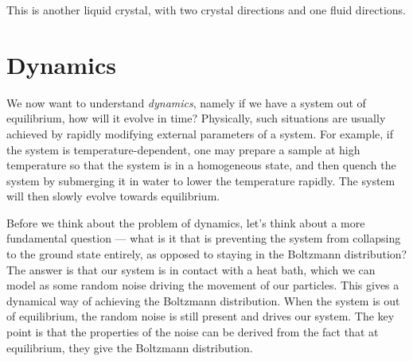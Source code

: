 \documentclass[a4paper]{article}
\begin{document}
This is another liquid crystal, with two crystal directions and one fluid directions.

\section{Dynamics}
We now want to understand \emph{dynamics}, namely if we have a system out of equilibrium, how will it evolve in time? Physically, such situations are usually achieved by rapidly modifying external parameters of a system. For example, if the system is temperature-dependent, one may prepare a sample at high temperature so that the system is in a homogeneous state, and then quench the system by submerging it in water to lower the temperature rapidly. The system will then slowly evolve towards equilibrium. 

Before we think about the problem of dynamics, let's think about a more fundamental question --- what is it that is preventing the system from collapsing to the ground state entirely, as opposed to staying in the Boltzmann distribution? The answer is that our system is in contact with a heat bath, which we can model as some random noise driving the movement of our particles. This gives a dynamical way of achieving the Boltzmann distribution. When the system is out of equilibrium, the random noise is still present and drives our system. The key point is that the properties of the noise can be derived from the fact that at equilibrium, they give the Boltzmann distribution.
\end{document}
